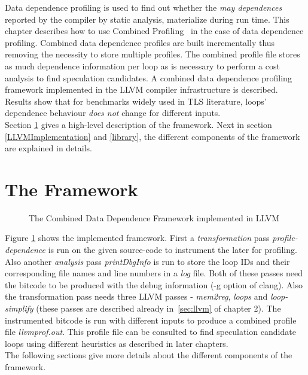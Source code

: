 \documentclass[10pt]{report}          %
\begin{document}
Data dependence profiling is used to find out whether the \textit{may dependences} reported by the compiler by static analysis, materialize during run time.  This chapter describes how to use Combined Profiling~\cite{BerubeCP} in the case of data dependence profiling.  Combined data dependence profiles are built incrementally thus removing the necessity to store multiple profiles.  The combined profile file stores as much dependence information per loop as is necessary to perform a cost analysis to find speculation candidates.  A combined data dependence profiling framework implemented in the LLVM compiler infrastructure is described.  Results show that for benchmarks widely used in TLS literature, loops' dependence behaviour \textit{does not} change for different inputs.\\
Section \ref{framework} gives a high-level description of the framework.  Next in section \ref{LLVMImplementation} and \ref{library}, the different components of the framework are explained in details.

\section{The Framework}
\label{framework}

\begin{figure}[ht]
\begin{center}
\renewcommand{\figure}{Fig.}
\caption{ The Combined Data Dependence Framework implemented in LLVM}
\end{center}
\label{fig:framework}
\end{figure}

Figure \ref{fig:framework} shows the implemented framework.  First a \textit{transformation} pass \textit{profile-dependence} is run on the given source-code to instrument the later for profiling.  Also another \textit{analysis} pass \textit{printDbgInfo} is run to store the loop IDs and their corresponding file names and line numbers in a \textit{log} file.  Both of these passes need the bitcode to be produced with the debug information (-g option of clang).  Also the transformation pass needs three LLVM passes - \textit{mem2reg}, \textit{loops} and \textit{loop-simplify} (these passes are described already in~\ref{sec:llvm} of chapter 2). The instrumented bitcode is run with different inputs to produce a combined profile file \textit{llvmprof.out}.  This profile file can be consulted to find speculation candidate loops using different heuristics as described in later chapters.\\
The following sections give more details about the different components of the framework.
\end{document}
